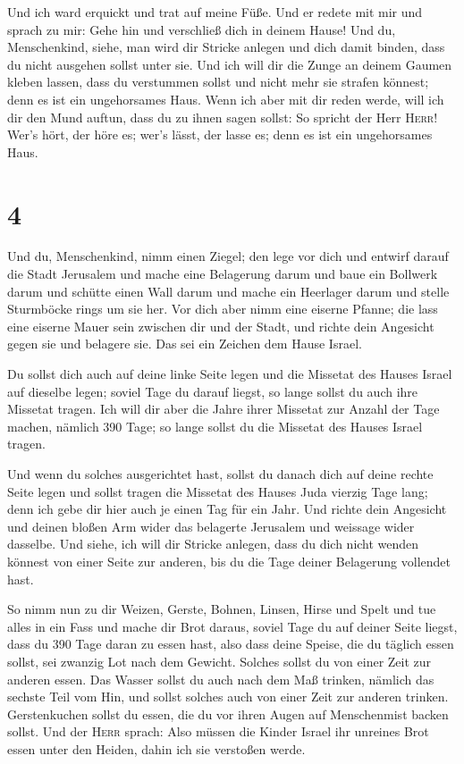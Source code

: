  Und ich ward erquickt und trat auf meine Füße. Und er
redete mit mir und sprach zu mir: Gehe hin und verschließ dich in deinem
Hause!  Und du, Menschenkind, siehe, man wird dir Stricke
anlegen und dich damit binden, dass du nicht ausgehen sollst unter sie.
 Und ich will dir die Zunge an deinem Gaumen kleben
lassen, dass du verstummen sollst und nicht mehr sie strafen könnest;
denn es ist ein ungehorsames Haus.  Wenn ich aber mit dir
reden werde, will ich dir den Mund auftun, dass du zu ihnen sagen
sollst: So spricht der Herr \textsc{Herr}! Wer's hört, der höre es;
wer's lässt, der lasse es; denn es ist ein ungehorsames Haus.

\hypertarget{section-3}{%
\section{4}\label{section-3}}

 Und du, Menschenkind, nimm einen Ziegel; den lege vor
dich und entwirf darauf die Stadt Jerusalem  und mache
eine Belagerung darum und baue ein Bollwerk darum und schütte einen Wall
darum und mache ein Heerlager darum und stelle Sturmböcke rings um sie
her.  Vor dich aber nimm eine eiserne Pfanne; die lass
eine eiserne Mauer sein zwischen dir und der Stadt, und richte dein
Angesicht gegen sie und belagere sie. Das sei ein Zeichen dem Hause
Israel.

 Du sollst dich auch auf deine linke Seite legen und die
Missetat des Hauses Israel auf dieselbe legen; soviel Tage du darauf
liegst, so lange sollst du auch ihre Missetat tragen.  Ich
will dir aber die Jahre ihrer Missetat zur Anzahl der Tage machen,
nämlich 390 Tage; so lange sollst du die Missetat des Hauses Israel
tragen.

 Und wenn du solches ausgerichtet hast, sollst du danach
dich auf deine rechte Seite legen und sollst tragen die Missetat des
Hauses Juda vierzig Tage lang; denn ich gebe dir hier auch je einen Tag
für ein Jahr.  Und richte dein Angesicht und deinen bloßen
Arm wider das belagerte Jerusalem und weissage wider dasselbe.
 Und siehe, ich will dir Stricke anlegen, dass du dich
nicht wenden könnest von einer Seite zur anderen, bis du die Tage deiner
Belagerung vollendet hast.

 So nimm nun zu dir Weizen, Gerste, Bohnen, Linsen, Hirse
und Spelt und tue alles in ein Fass und mache dir Brot daraus, soviel
Tage du auf deiner Seite liegst, dass du 390 Tage daran zu essen hast,
 also dass deine Speise, die du täglich essen sollst, sei
zwanzig Lot nach dem Gewicht. Solches sollst du von einer Zeit zur
anderen essen.  Das Wasser sollst du auch nach dem Maß
trinken, nämlich das sechste Teil vom Hin, und sollst solches auch von
einer Zeit zur anderen trinken.  Gerstenkuchen sollst du
essen, die du vor ihren Augen auf Menschenmist backen sollst.
 Und der \textsc{Herr} sprach: Also müssen die Kinder
Israel ihr unreines Brot essen unter den Heiden, dahin ich sie verstoßen
werde.

